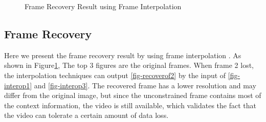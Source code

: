 \documentclass[sigconf]{acmart}
\begin{document}
\begin{figure}[ht]
\centering
{}

\vspace{-3mm}
\caption{Frame Recovery Result using Frame Interpolation}
\vspace{-3mm}
\label{fig-frameRecovery}
\end{figure}

\subsection{Frame Recovery}
Here we present the frame recovery result by using frame interpolation \cite{meyer2015phase, niklaus2018context,van2017frame}. As shown in Figure\ref{fig-frameRecovery}, The top 3 figures are the original frames. When frame 2 lost, the interpolation techniques can output \ref{fig-recoverof2} by the input of \ref{fig-interop1} and \ref{fig-interop3}. The recovered frame has a lower resolution and may differ from the original image, but since the unconstrained frame contains most of the context information, the video is still available, which validates the fact that the video can tolerate a certain amount of data loss.
\end{document}
